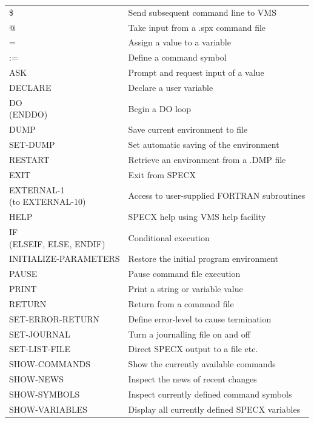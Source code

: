 \documentclass[11pt,twoside]{report}
\begin{document}
\begin{tabular}{ll}
\$                     & Send subsequent command line to VMS\\
@                      & Take input from a .spx command file\\
=                      & Assign a value to a variable \\
:=                     & Define a command symbol\\
ASK                    & Prompt and request input of a value\\
DECLARE                & Declare a user variable\\
\parbox[T]{1.5in}{DO\\
 (ENDDO)}              & Begin a DO loop\\
DUMP                   & Save current environment to file\\
SET-DUMP               & Set automatic saving of the environment\\
RESTART                & Retrieve an environment from a .DMP file\\
EXIT                   & Exit from SPECX\\
\parbox[T]{1.5in}{EXTERNAL-1\\
  (to EXTERNAL-10)}     & Access to user-supplied FORTRAN subroutines\\
HELP                   & SPECX help using VMS help facility\\
\parbox[T]{2.0in}{IF\\
 (ELSEIF, ELSE, ENDIF)}& Conditional execution \\
INITIALIZE-PARAMETERS  & Restore the initial program environment\\
PAUSE                  & Pause command file execution\\
PRINT                  & Print a string or variable value\\
RETURN                 & Return from a command file\\
SET-ERROR-RETURN       & Define error-level to cause termination\\
SET-JOURNAL            & Turn a journalling file on and off\\
SET-LIST-FILE          & Direct SPECX output to a file etc.\\
SHOW-COMMANDS          & Show the currently available commands\\
SHOW-NEWS              & Inspect the news of recent changes\\
SHOW-SYMBOLS           & Inspect currently defined command symbols\\
SHOW-VARIABLES         & Display all currently defined SPECX variables\\
\end{tabular}
\end{document}
